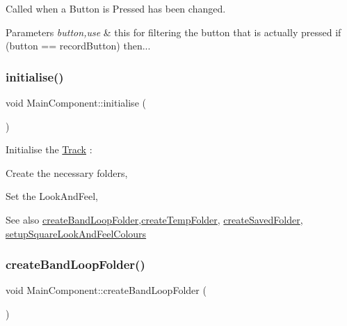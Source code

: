 Called when a Button is Pressed has been changed. 
\begin{DoxyParams}{Parameters}
{\em button,use} & this for filtering the button that is actually pressed if (button == record\+Button) then... \\
\hline
\end{DoxyParams}
\mbox{\label{class_main_component_ad616083023bd51de9fd23702039dc10f}} 
\subsubsection{\texorpdfstring{initialise()}{initialise()}}
{\footnotesize\ttfamily void Main\+Component\+::initialise (\begin{DoxyParamCaption}{ }\end{DoxyParamCaption})}

Initialise the \mbox{\hyperlink{class_track}{Track}} \+:
\begin{DoxyItemize}
\item Create the necessary folders,
\item Set the Look\+And\+Feel, \begin{DoxySeeAlso}{See also}
\mbox{\hyperlink{class_main_component_a0a21d29760452df310f4ae5b15290818}{create\+Band\+Loop\+Folder}},\mbox{\hyperlink{class_main_component_ab9345f49a82ce81b98cd552e88b0ee08}{create\+Temp\+Folder}}, \mbox{\hyperlink{class_main_component_af9933860cbfc7c14fb4403e732e1f2c1}{create\+Saved\+Folder}}, \mbox{\hyperlink{class_main_component_a6fa14be18558d997ff7eeccc8d85e4f4}{setup\+Square\+Look\+And\+Feel\+Colours}} 
\end{DoxySeeAlso}

\end{DoxyItemize}\mbox{\label{class_main_component_a0a21d29760452df310f4ae5b15290818}} 
\subsubsection{\texorpdfstring{createBandLoopFolder()}{createBandLoopFolder()}}
{\footnotesize\ttfamily void Main\+Component\+::create\+Band\+Loop\+Folder (\begin{DoxyParamCaption}{ }\end{DoxyParamCaption})}

